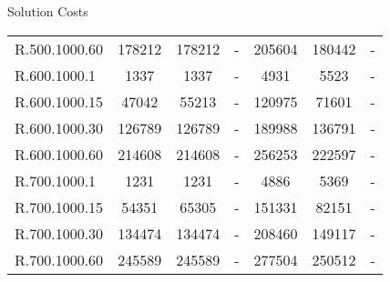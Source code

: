 \documentclass{beamer}
\begin{document}
\begin{frame}{Solution Costs}
{\begin{tabular}{lcccccc}
			R.500.1000.60  & 178212 &    178212  & -      &   205604 &   180442 &   -     \\
			R.600.1000.1   & 1337   &    1337    & -      &   4931   &   5523   &   -     \\
			R.600.1000.15  & 47042  &    55213   & -      &   120975 &   71601  &   -     \\
			R.600.1000.30  & 126789 &    126789  & -      &   189988 &   136791 &   -     \\
			R.600.1000.60  & 214608 &    214608  & -      &   256253 &   222597 &   -     \\
			R.700.1000.1   & 1231   &    1231    & -      &   4886   &   5369   &   -     \\
			R.700.1000.15  & 54351  &    65305   & -      &   151331 &   82151  &   -     \\
			R.700.1000.30  & 134474 &    134474  & -      &   208460 &   149117 &   -     \\
			R.700.1000.60  & 245589 &    245589  & -      &   277504 &   250512 &   -     \\
\end{tabular}
}
\end{frame}
\end{document}
